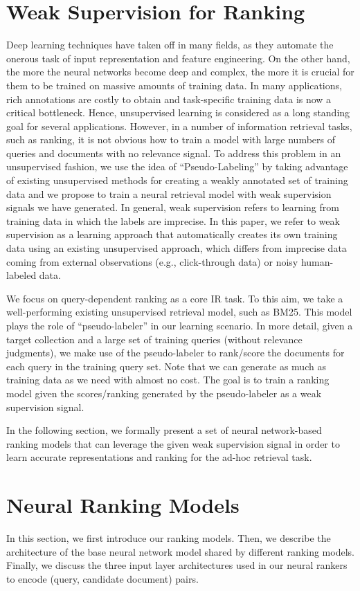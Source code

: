 \documentclass[sigconf]{acmart}
\newcommand{\sshrink}{\vspace{-.80ex}}
\begin{document}
\sshrink
\section{Weak Supervision for Ranking}
Deep learning techniques have taken off in many fields, as they automate the onerous task of input representation and feature engineering. 
On the other hand, the more the neural networks become deep and complex, the more it is crucial for them to be trained on massive amounts of training data.
In many applications, rich annotations are costly to obtain and task-specific training data is now a critical bottleneck. 
Hence, unsupervised learning is considered as a long standing goal for several applications. However, in a number of information retrieval tasks, such as ranking, it is not obvious how to train a model with large numbers of queries and documents with no relevance signal.
To address this problem in an unsupervised fashion, we use the idea of ``Pseudo-Labeling'' by taking advantage of existing unsupervised methods for creating a weakly annotated set of training data and we propose to train a neural retrieval model with weak supervision signals we have generated.
In general, weak supervision refers to learning from training data in which the labels are imprecise. In this paper, we refer to weak supervision as a learning approach that automatically creates its own training data using an existing unsupervised approach, which differs from imprecise data coming from external observations (e.g., click-through data) or noisy human-labeled data.

We focus on query-dependent ranking as a core IR task. To this aim, we take a well-performing existing unsupervised retrieval model, such as BM25. This model plays the role of ``pseudo-labeler'' in our learning scenario. In more detail, given a target collection and a large set of training queries (without relevance judgments), we make use of the pseudo-labeler to rank/score the documents for each query in the training query set.  Note that we can generate as much as training data as we need with almost no cost. The goal is to train a ranking model given the scores/ranking generated by the pseudo-labeler as a weak supervision signal. 
 
In the following section, we formally present a set of neural network-based ranking models that can leverage the given weak supervision signal in order to learn accurate representations and ranking for the ad-hoc retrieval task.

\sshrink
\section{Neural Ranking Models}
In this section, we first introduce our ranking models. Then, we describe the architecture of the base neural network model shared by different ranking models. Finally, we discuss the three input layer architectures used in our neural rankers to encode (query, candidate document) pairs.
\end{document}
